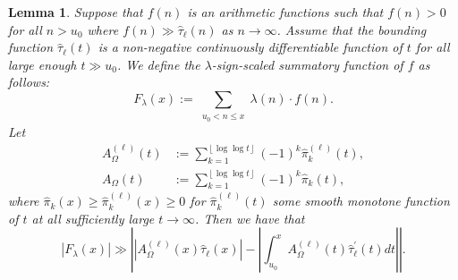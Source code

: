 \documentclass[11pt,reqno,a4letter]{article}
\numberwithin{figure}{section}
\numberwithin{table}{section}
\newcommand{\floor}[1]{\left\lfloor #1 \right\rfloor}
\theoremstyle{plain}
\newtheorem{lemma}[theorem]{Lemma}
\numberwithin{theorem}{section}
\theoremstyle{definition}
\newcommand{\SuccSim}[0]{\overset{_{\scriptsize{\blacktriangle}}}{\succsim}}
\renewcommand{\SuccSim}[0]{\ensuremath{\gg}}
\begin{document}
\begin{lemma} 
\label{lemma_CLT_and_AbelSummation} 
Suppose that $f(n)$ is an arithmetic functions 
such that $f(n) > 0$ for all $n > u_0$ where 
$f(n) \SuccSim \widehat{\tau}_{\ell}(n)$ as $n \rightarrow \infty$. Assume that 
the bounding function $\widehat{\tau}_{\ell}(t)$ is a non-negative 
continuously differentiable function of $t$ for all 
large enough $t \gg u_0$.  
We define the $\lambda$-sign-scaled summatory function of $f$ as follows: 
\[
F_{\lambda}(x) := \sum_{\substack{u_0 < n \leq x}} \lambda(n) \cdot f(n). 
\]
Let 
\begin{align*} 
A_{\Omega}^{(\ell)}(t) & := \sum_{k=1}^{\floor{\log\log t}} (-1)^k \widehat{\pi}_k^{(\ell)}(t), \\ 
A_{\Omega}(t) & := \sum_{k=1}^{\floor{\log\log t}} (-1)^k \widehat{\pi}_k(t), 
\end{align*} 
where $\widehat{\pi}_k(x) \geq \widehat{\pi}_k^{(\ell)}(x) \geq 0$ for 
$\widehat{\pi}_k^{(\ell)}(t)$ some smooth monotone 
function of $t$ at all sufficiently large $t \rightarrow \infty$. 
Then we have that 
\begin{equation} 
\label{eqn_Flambdax_RHA_AbelSummationFormula_v1} 
|F_{\lambda}(x)| \SuccSim \left\lvert 
     \left\lvert A_{\Omega}^{(\ell)}(x) \widehat{\tau}_{\ell}(x) \right\rvert - 
     \left\lvert \int_{u_0}^{x} A_{\Omega}^{(\ell)}(t) \widehat{\tau}_{\ell}^{\prime}(t) dt 
     \right\rvert \right\rvert.  
\end{equation} 
\end{lemma}
\end{document}
